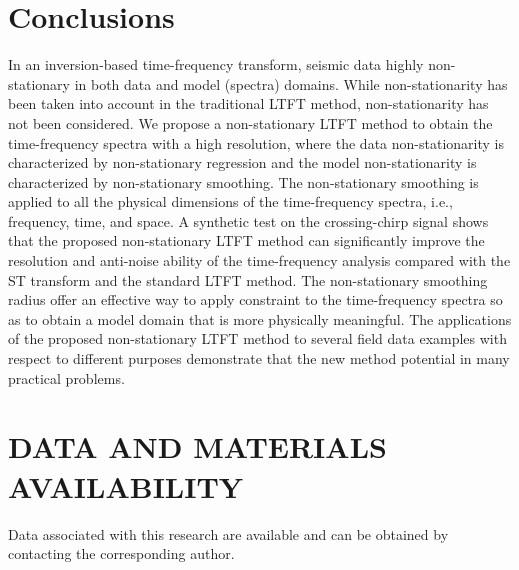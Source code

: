 






\section{Conclusions}
In an inversion-based time-frequency transform, seismic data  highly non-stationary in both data and model (spectra) domains. While  non-stationarity has been taken into account in the traditional LTFT method,  non-stationarity has not been considered. We propose a non-stationary LTFT method to obtain the time-frequency spectra with a high resolution, where the data non-stationarity is characterized by non-stationary regression and the model non-stationarity is characterized by non-stationary smoothing. The non-stationary smoothing is applied to all the physical dimensions of the time-frequency spectra, i.e., frequency, time, and space. A synthetic test on the crossing-chirp signal shows that the proposed non-stationary LTFT method can significantly improve the resolution and anti-noise ability of the time-frequency analysis compared with the ST transform and the standard LTFT method. The non-stationary smoothing radius  offer an effective way to apply  constraint to the time-frequency spectra so as to obtain a model domain that is more physically meaningful. The applications of the proposed non-stationary LTFT method to several field data examples with respect to different purposes demonstrate that the new method  potential in many practical problems.

\section{DATA AND MATERIALS AVAILABILITY}
Data associated with this research are available and can be obtained by contacting the corresponding author.








